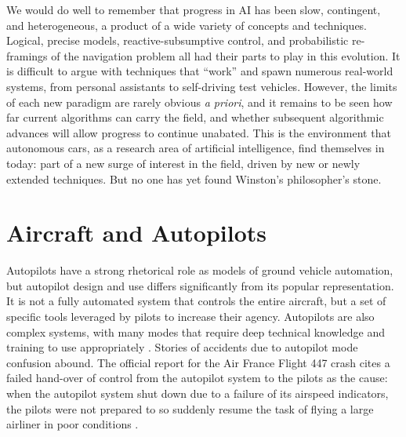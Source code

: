 We would do well to remember that 
progress in AI has been slow, contingent, and heterogeneous, a product of a
wide variety of concepts and techniques. Logical, precise models,
reactive-subsumptive control, and probabilistic re-framings of the
navigation problem all had their parts to play in this evolution. It
is difficult to argue with techniques that ``work'' and
spawn numerous real-world systems, from personal assistants to
self-driving test vehicles. However, the limits of each new paradigm are rarely
obvious \emph{a priori}, and it remains to be seen how far current
algorithms can carry the field, and whether subsequent algorithmic
advances will allow progress to continue unabated. This is the
environment that autonomous cars, as a 
research area of artificial intelligence, find themselves in today:
part of a new surge of interest in the field, driven by new
or newly extended techniques. But no one has yet found Winston's
philosopher's stone.


\section{Aircraft and Autopilots}



Autopilots have a strong rhetorical role as
models of ground vehicle automation, but autopilot design and use differs 
significantly from its popular representation. It is not a fully automated
system that controls the entire aircraft, but a set of specific tools
leveraged by pilots to increase their agency. Autopilots are also complex systems, with many modes
that require deep technical knowledge and training to use
appropriately \cite{harrisPsych}. Stories of accidents
due to autopilot mode confusion abound. The official report for
the Air France Flight 447 crash cites a
failed hand-over of control from the autopilot system to the pilots as
the cause:
when the autopilot system shut down due to a failure of its airspeed
indicators, the pilots were not prepared to so suddenly resume the
task of flying a large airliner in poor conditions \cite{AF447}.

